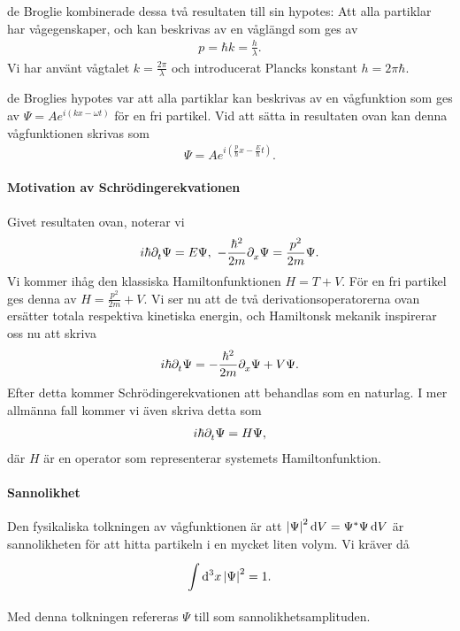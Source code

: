 de Broglie kombinerade dessa två resultaten till sin hypotes: Att alla partiklar har vågegenskaper, och kan beskrivas av en våglängd som ges av
\begin{align*}
	p = \hbar k = \frac{h}{\lambda}.
\end{align*}
Vi har använt vågtalet $k = \frac{2\pi}{\lambda}$ och introducerat Plancks konstant $h = 2\pi\hbar$.

de Broglies hypotes var att alla partiklar kan beskrivas av en vågfunktion som ges av $\Psi = Ae^{i(kx - \omega t)}$ för en fri partikel. Vid att sätta in resultaten ovan kan denna vågfunktionen skrivas som
\begin{align*}
	\Psi = Ae^{i(\frac{p}{\hbar}x - \frac{E}{\hbar}t)}.
\end{align*}

\paragraph{Motivation av Schrödingerekvationen}
Givet resultaten ovan, noterar vi
\begin{align*}
	i\hbar\partial_{t}^{}\Psi = E\Psi,\ -\frac{\hbar^{2}}{2m}\partial_{x}^{}\Psi = \frac{p^{2}}{2m}\Psi.
\end{align*}
Vi kommer ihåg den klassiska Hamiltonfunktionen $H = T + V$. För en fri partikel ges denna av $H = \frac{p^{2}}{2m} + V$. Vi ser nu att de två derivationsoperatorerna ovan ersätter totala respektiva kinetiska energin, och Hamiltonsk mekanik inspirerar oss nu att skriva
\begin{align*}
	i\hbar\partial_{t}^{}\Psi = -\frac{\hbar^{2}}{2m}\partial_{x}^{}\Psi + V\Psi.
\end{align*}
Efter detta kommer Schrödingerekvationen att behandlas som en naturlag. I mer allmänna fall kommer vi även skriva detta som
\begin{align*}
	i\hbar\partial_{t}^{}\Psi = H\Psi,
\end{align*}
där $H$ är en operator som representerar systemets Hamiltonfunktion.

\paragraph{Sannolikhet}
Den fysikaliska tolkningen av vågfunktionen är att $\abs{\Psi}^{2}\dd{V} = \Psi^{*}\Psi\dd{V}$ är sannolikheten för att hitta partikeln i en mycket liten volym. Vi kräver då
\begin{align*}
	\int\limits_{}^{}\dd[3]{x}\abs{\Psi}^{2} = 1.
\end{align*}
Med denna tolkningen refereras $\Psi$ till som sannolikhetsamplituden.

